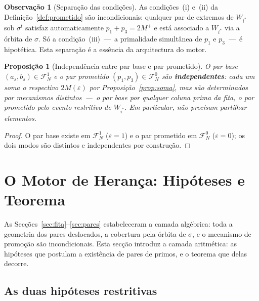 \documentclass[12pt, a4paper]{article}
\theoremstyle{plain}
\newtheorem{proposition}[theorem]{Proposição}
\theoremstyle{definition}
\newtheorem{remark}[theorem]{Observação}
\theoremstyle{remark}
\begin{document}
	\begin{remark}[Separação das condições]
		As condições~(i) e~(ii) da Definição~\ref{def:prometido} são
		incondicionais: qualquer par de extremos de $W_{i^*}$ sob
		$\sigma^t$ satisfaz automaticamente $p_1+p_3=2M^+$ e está
		associado a $W_{i^*}$ via a órbita de $\sigma$.  Só a
		condição~(iii)~---~a primalidade simultânea de $p_1$ e $p_3$~---~é
		hipotética.  Esta separação é a essência da arquitectura do motor.
	\end{remark}
	
	\begin{proposition}[Independência entre par base e par prometido]
		\label{prop:indep}
		O par base $(a_s,b_s)\in\mathcal{F}_N^1$ e o par prometido
		$(p_1,p_3)\in\mathcal{F}_N^0$ são \textbf{independentes}: cada
		um soma o respectivo $2M(\varepsilon)$ por
		Proposição~\ref{prop:soma}, mas são determinados por mecanismos
		distintos~---~o par base por qualquer coluna prima da fita, o par
		prometido pelo evento restritivo de $W_{i^*}$.  Em particular,
		não precisam partilhar elementos.
	\end{proposition}
	
	\begin{proof}
		O par base existe em $\mathcal{F}_N^1$ ($\varepsilon=1$) e o par
		prometido em $\mathcal{F}_N^0$ ($\varepsilon=0$); os dois modos
		são distintos e independentes por construção.
	\end{proof}
	
	\section{O Motor de Herança: Hipóteses e Teorema}
	\label{sec:motor}
	
	As Secções~\ref{sec:fita}--\ref{sec:pares} estabeleceram a camada
	algébrica: toda a geometria dos pares deslocados, a cobertura pela
	órbita de $\sigma$, e o mecanismo de promoção são incondicionais.
	Esta secção introduz a camada aritmética: as hipóteses que postulam
	a existência de pares de primos, e o teorema que delas decorre.
	
	\subsection{As duas hipóteses restritivas}
	
\end{document}
